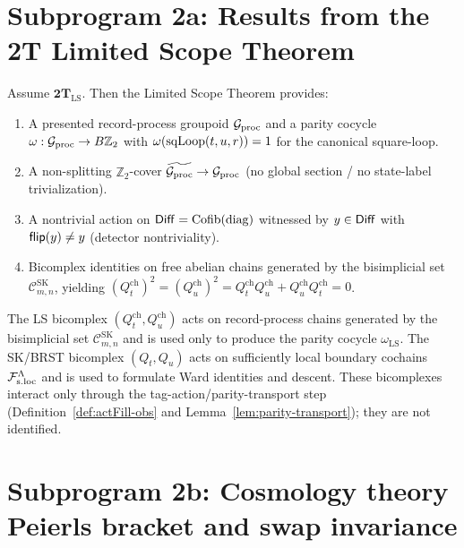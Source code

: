 \section{Subprogram 2a: Results from the 2T Limited Scope Theorem}
\label{sec:limited-scope-import}

\begin{theorem}
\label{thm:LS-import}
Assume $\mathbf{2T}_{\mathrm{LS}}$. Then the Limited Scope Theorem provides:
\begin{enumerate}[label=\textnormal{(LS\arabic*)},leftmargin=*,itemsep=0.4em]
\item A presented record-process groupoid $\mathcal G_{\mathrm{proc}}$ and a parity cocycle
  $\omega:\mathcal G_{\mathrm{proc}}\to B\mathbb Z_2$ with
  $\omega(\mathrm{sqLoop}(t,u,r))=1$ for the canonical square-loop.
\item A non-splitting $\mathbb Z_2$-cover
  $\widetilde{\mathcal G_{\mathrm{proc}}}\to\mathcal G_{\mathrm{proc}}$ (no global section / no state-label trivialization).
\item A nontrivial action on $\mathsf{Diff}=\mathrm{Cofib}(\operatorname{diag})$ witnessed by
  $y\in\mathsf{Diff}$ with $\mathsf{flip}(y)\neq y$ (detector nontriviality).
\item Bicomplex identities on free abelian chains generated by the
  bisimplicial set $\mathcal C^{\mathrm{SK}}_{m,n}$, yielding
  $(Q_t^{\mathrm{ch}})^2=(Q_u^{\mathrm{ch}})^2=
  Q_t^{\mathrm{ch}}Q_u^{\mathrm{ch}}+Q_u^{\mathrm{ch}}Q_t^{\mathrm{ch}}=0$.
\end{enumerate}
\end{theorem}

\begin{remark}
The LS bicomplex $(Q_t^{\mathrm{ch}},Q_u^{\mathrm{ch}})$ acts on record-process chains
generated by the bisimplicial set $\mathcal C^{\mathrm{SK}}_{m,n}$ and is used only to
produce the parity cocycle $\omega_{\mathrm{LS}}$.
The SK/BRST bicomplex $(Q_t,Q_u)$ acts on sufficiently local boundary cochains $\mathcal F_{\mathrm{s.loc}}^\Lambda$
and is used to formulate Ward identities and descent.
These bicomplexes interact only through the tag-action/parity-transport step
(Definition~\ref{def:actFill-obs} and Lemma~\ref{lem:parity-transport}); they are not
identified.
\end{remark}

\section{Subprogram 2b: Cosmology theory Peierls bracket and swap invariance}
\label{sec:cosmo-peierls-import}


